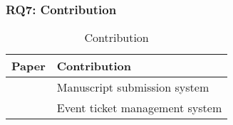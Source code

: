 \clearpage
\subsubsection{RQ7: Contribution}

\begin{longtable}{ |c|p{6cm}| }
	\caption{Contribution} \\
	\hline
 	\textbf{Paper} & \textbf{Contribution} \\ [0.5ex] 
 	\hline\hline
 	\endhead
 	\cite{2017_Gipp} & Manuscript submission system\\
	\hline
	\cite{2017_Tackmann} & Event ticket management system \\
	\hline
\end{longtable}